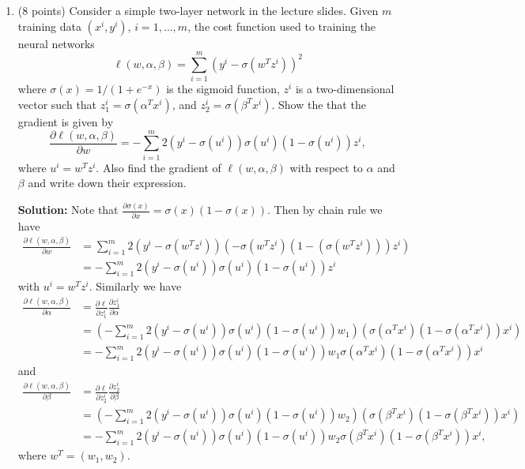 \documentclass[twoside,10pt]{article}
\begin{document}
\begin{enumerate}
\begin{enumerate}
\item (8 points) 
Consider a simple two-layer network in the lecture slides. Given $m$ training data $(x^i, y^i)$, $i = 1, \ldots, m$, the cost function used to training the neural networks
\[
\ell(w, \alpha, \beta) = \sum_{i=1}^m (y^i - \sigma(w^T z^i))^2
\]
where $\sigma (x) = 1/(1+e^{-x})$ is the sigmoid function, $z^i$ is a two-dimensional vector such that  $z_1^i = \sigma(\alpha^T x^i)$, and $z_2^i = \sigma(\beta^T x^i)$. Show the that the gradient is given by
\[
\frac{\partial \ell(w, \alpha, \beta) }{\partial w}
= - \sum_{i=1}^m 2(y^i - \sigma(u^i))\sigma(u^i)(1-\sigma(u^i)) z^i,
\]
where $u^i = w^T z^i$. Also find the gradient of $\ell(w, \alpha, \beta)$ with respect to $\alpha$ and $\beta$ and write down their expression.
\begin{tcolorbox}
\textbf{Solution:} Note that $\frac{\partial \sigma(x)}{\partial x} = \sigma(x)(1-\sigma(x))$. Then by chain rule we have
\begin{align*}
\frac{\partial \ell(w, \alpha, \beta) }{\partial w}
& = \sum_{i=1}^m 2 (y^i - \sigma(w^Tz^i)) (-\sigma(w^Tz^i) (1 - (\sigma(w^Tz^i))) z^i)\\
& = -\sum_{i=1}^m 2(y^i - \sigma(u^i))\sigma(u^i)(1-\sigma(u^i)) z^i 
\end{align*}
with $u^i = w^T z^i$. Similarly we have 
\begin{align*}
\frac{\partial \ell(w, \alpha, \beta) }{\partial \alpha}
& = \frac{\partial \ell}{\partial z_1^i} \frac{\partial z_1^i} {\partial \alpha} \\
& = \left (-\sum_{i=1}^m 2(y^i - \sigma(u^i))\sigma(u^i)(1-\sigma(u^i)) w_1 \right )\left( \sigma(\alpha^T x^i) (1 - \sigma(\alpha^T x^i)) x^i \right )\\
& = -\sum_{i=1}^m 2(y^i - \sigma(u^i))\sigma(u^i)(1-\sigma(u^i)) w_1 \sigma(\alpha^T x^i) (1 - \sigma(\alpha^T x^i)) x^i 
\end{align*}
and 
\begin{align*}
\frac{\partial \ell(w, \alpha, \beta) }{\partial \beta}
& = \frac{\partial \ell}{\partial z_2^i} \frac{\partial z_2^i} {\partial \beta} \\
& = \left (-\sum_{i=1}^m 2(y^i - \sigma(u^i))\sigma(u^i)(1-\sigma(u^i)) w_2 \right )\left( \sigma(\beta^T x^i) (1 - \sigma(\beta^T x^i)) x^i \right )\\
& = -\sum_{i=1}^m 2(y^i - \sigma(u^i))\sigma(u^i)(1-\sigma(u^i)) w_2 \sigma(\beta^T x^i) (1 - \sigma(\beta^T x^i)) x^i,
\end{align*}
where $w^T = (w_1, w_2)$.
\end{tcolorbox}
\end{enumerate}


\end{enumerate}
\end{document}
